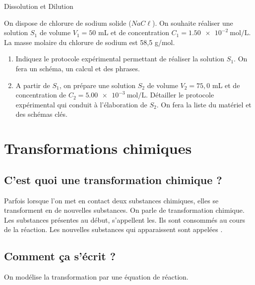  
  Dissolution et Dilution

On dispose de chlorure de sodium solide ($NaC\ell$). On souhaite
réaliser une solution $S_1$ de volume $V_1=50$ mL et de concentration
$C_1=\SI{1.50e-2}{\mol\per\liter}$. La masse molaire du chlorure de
sodium est 58,5 g/mol.

\begin{enumerate}
    \item Indiquez le protocole expérimental permettant de réaliser la solution $S_1$. On fera un schéma, un calcul et des phrases.
    \item A partir de $S_1$, on prépare une solution $S_2$ de volume $V_2=75,0$ mL et de concentration de $C_2=\SI{5.00e-3}{\mol\per\liter}$. Détailler le protocole expérimental qui conduit à l'élaboration de $S_2$. On fera la liste du matériel et des schémas clés.
\end{enumerate}

 \section{Transformations chimiques}
 \subsection{C'est quoi une transformation chimique ?}
 Parfois lorsque l'on met en contact deux substances chimiques, elles se transforment en de nouvelles substances.  On parle de transformation chimique. Les substances présentes au début, s'appellent les. Ils sont consommés au cours de la réaction. Les nouvelles substances qui apparaissent sont appelées . 

 \subsection{Comment ça s'écrit ?}
 On modélise la transformation par une équation de réaction. \\

